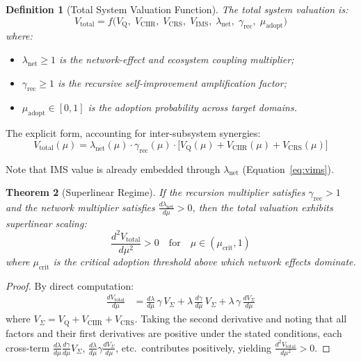 \documentclass[11pt,a4paper]{article}
\newtheorem{definition}{Definition}[section]
\newtheorem{theorem}[definition]{Theorem}
\theoremstyle{remark}
\newcommand{\VQ}{V_{\mathrm{Q}}}
\newcommand{\VCIIR}{V_{\mathrm{CIIR}}}
\newcommand{\VCRS}{V_{\mathrm{CRS}}}
\newcommand{\VIMS}{V_{\mathrm{IMS}}}
\newcommand{\Vtot}{V_{\mathrm{total}}}
\begin{document}
\begin{definition}[Total System Valuation Function]
\label{def:total_value}
The total system valuation is:
\begin{equation}
  \Vtot = f\bigl(\VQ,\; \VCIIR,\; \VCRS,\; \VIMS,\;
  \lambda_{\mathrm{net}},\; \gamma_{\mathrm{rec}},\;
  \mu_{\mathrm{adopt}}\bigr)
  \label{eq:vtotal}
\end{equation}
where:
\begin{itemize}[nosep]
  \item $\lambda_{\mathrm{net}} \geq 1$ is the network-effect and
        ecosystem coupling multiplier;
  \item $\gamma_{\mathrm{rec}} \geq 1$ is the recursive
        self-improvement amplification factor;
  \item $\mu_{\mathrm{adopt}} \in [0,1]$ is the adoption probability
        across target domains.
\end{itemize}
\end{definition}

The explicit form, accounting for inter-subsystem synergies:
\begin{equation}
  \Vtot(\mu)
  = \lambda_{\mathrm{net}}(\mu) \cdot \gamma_{\mathrm{rec}}(\mu)
    \cdot \bigl[\VQ(\mu) + \VCIIR(\mu) + \VCRS(\mu)\bigr]
  \label{eq:vtotal_explicit}
\end{equation}

Note that IMS value is already embedded through
$\lambda_{\mathrm{net}}$ (Equation~\ref{eq:vims}).

\begin{theorem}[Superlinear Regime]
\label{thm:superlinear}
If the recursion multiplier satisfies $\gamma_{\mathrm{rec}} > 1$ and
the network multiplier satisfies
$\frac{d\lambda_{\mathrm{net}}}{d\mu} > 0$, then the total valuation
exhibits superlinear scaling:
\[
  \frac{d^2 \Vtot}{d\mu^2} > 0
  \quad\text{for}\quad
  \mu \in (\mu_{\mathrm{crit}}, 1)
\]
where $\mu_{\mathrm{crit}}$ is the critical adoption threshold above
which network effects dominate.
\end{theorem}

\begin{proof}
By direct computation:
\begin{align}
  \frac{d\Vtot}{d\mu}
  &= \frac{d\lambda}{d\mu}\,\gamma\,V_{\Sigma}
   + \lambda\,\frac{d\gamma}{d\mu}\,V_{\Sigma}
   + \lambda\,\gamma\,\frac{dV_{\Sigma}}{d\mu}
\end{align}
where $V_{\Sigma} = \VQ + \VCIIR + \VCRS$.  Taking the second
derivative and noting that all factors and their first derivatives
are positive under the stated conditions, each cross-term
$\frac{d\lambda}{d\mu}\frac{d\gamma}{d\mu}V_{\Sigma}$,
$\frac{d\lambda}{d\mu}\gamma\frac{dV_{\Sigma}}{d\mu}$, etc.\
contributes positively, yielding $\frac{d^2\Vtot}{d\mu^2} > 0$.
\end{proof}
\end{document}
